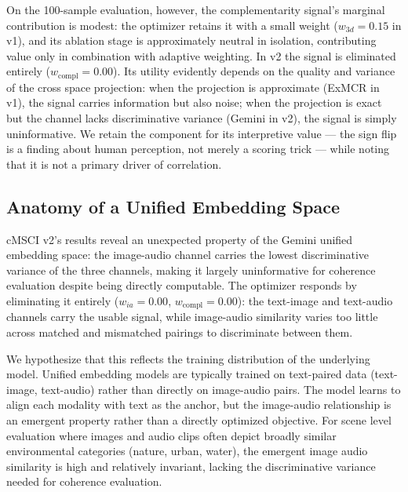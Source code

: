 \documentclass[a4paper,fleqn]{cas-sc}
\begin{document}
\begin{itemize}
On the 100-sample evaluation, however, the complementarity signal's marginal contribution is modest: the optimizer retains it with a small weight ($w_{3d} = 0.15$ in v1), and its ablation stage is approximately neutral in isolation, contributing value only in combination with adaptive weighting. In v2 the signal is eliminated entirely ($w_{\mathrm{compl}} = 0.00$). Its utility evidently depends on the quality and variance of the cross space projection: when the projection is approximate (ExMCR in v1), the signal carries information but also noise; when the projection is exact but the channel lacks discriminative variance (Gemini in v2), the signal is simply uninformative. We retain the component for its interpretive value — the sign flip is a finding about human perception, not merely a scoring trick — while noting that it is not a primary driver of correlation.

\subsection{Anatomy of a Unified Embedding Space}\label{sec:anatomy-unified}

cMSCI v2's results reveal an unexpected property of the Gemini unified embedding space: the image-audio channel carries the lowest discriminative variance of the three channels, making it largely uninformative for coherence evaluation despite being directly computable. The optimizer responds by eliminating it entirely ($w_{ia} = 0.00$, $w_{\mathrm{compl}} = 0.00$): the text-image and text-audio channels carry the usable signal, while image-audio similarity varies too little across matched and mismatched pairings to discriminate between them.

We hypothesize that this reflects the training distribution of the underlying model. Unified embedding models are typically trained on text-paired data (text-image, text-audio) rather than directly on image-audio pairs. The model learns to align each modality with text as the anchor, but the image-audio relationship is an emergent property rather than a directly optimized objective. For scene level evaluation where images and audio clips often depict broadly similar environmental categories (nature, urban, water), the emergent image audio similarity is high and relatively invariant, lacking the discriminative variance needed for coherence evaluation.


\end{itemize}
\end{document}
